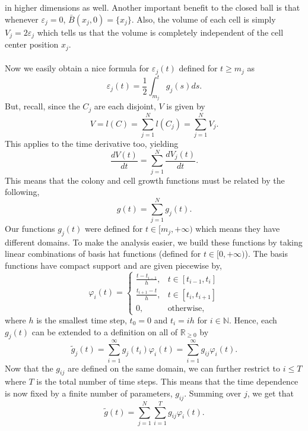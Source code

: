  in higher dimensions as well. Another important benefit to the closed ball 
 is that whenever $\varepsilon_j = 0$, $\bar{B} (x_j, 0) = \{ x_j\}$. Also, 
 the volume of each cell is simply $V_j = 2\varepsilon_j$ which tells us that
  the volume is completely independent of the cell center position $x_j$.
\\
\\
Now we easily obtain a nice formula for $\varepsilon_j(t)$  defined for $t \geq m_j$ as
\begin{equation*}
    \varepsilon_j(t) = \frac{1}{2} \int_{m_j}^t g_j(s)ds.
\end{equation*}
But, recall, since the $C_j$ are each disjoint, $V$ is given by
\begin{equation*}
    V = l(C) = \sum_{j=1}^N l(C_j) = \sum_{j=1}^N V_j.
\end{equation*}
This applies to the time derivative too, yielding 
\begin{equation*}
    \frac{dV(t)}{dt} = \sum_{j=1}^N \frac{dV_j(t)}{dt}.
\end{equation*}
This means that the colony and cell growth functions must be related by the following,
\begin{equation*}
    g(t) = \sum_{j=1}^N g_j (t).
\end{equation*}
Our functions $g_j(t)$ were defined for $t \in [m_j, +\infty)$ which means they have
 different domains. To make the analysis easier, we build these functions by taking
  linear combinations of basis hat functions (defined for $t \in [0, +\infty)$). 
  The basis functions have compact support and are given piecewise by,
\begin{equation*}
    \varphi_i(t) = \begin{cases} 
      \frac{t-t_{i-1}}{h}, & t \in [t_{i-1}, t_i] \\
      \frac{t_{i+1}-t}{h}, & t \in [t_{i}, t_{i+1}] \\
      0, & \textrm{otherwise}, 
   \end{cases}
\end{equation*}
where $h$ is the smallest time step, $t_0 = 0$ and $t_i = ih$ for $i \in \mathbb{N}$.
 Hence, each $g_j(t)$ can be extended to a definition on all of $\mathbb{R}_{\geq 0}$ by
\begin{equation*}
    \tilde{g}_j(t) = \sum_{i=1}^{\infty} g_j(t_i) \varphi_i(t) =\sum_{i=1}^{\infty} g_{ij} \varphi_i(t) .
\end{equation*}
Now that the $g_{ij}$ are defined on the same domain, we can further restrict to
 $i \leq T$ where $T$ is the total number of time steps. This means that the time 
 dependence is now fixed by a finite number of parameters, $g_{ij}$. Summing over
  $j$, we get that
\begin{equation*}
    \tilde{g}(t) = \sum_{j=1}^N \sum_{i=1}^{T} g_{ij} \varphi_i(t).
\end{equation*}